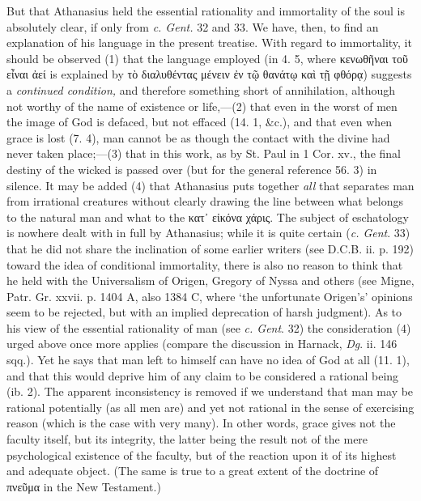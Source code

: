 But that Athanasius held the essential rationality and immortality of the soul is absolutely clear, if only from \emph{c. Gent.} 32 and 33. We have, then, to find an explanation of his language in the present treatise. With regard to immortality, it should be observed (1) that the language employed (in 4. 5, where \textgreek{κενωθῆναι τοῦ εἶναι ἀεί} is explained by \textgreek{τὸ διαλυθέντας μένειν ἐν τῷ θανάτῳ καὶ τῇ φθόρᾳ}) suggests a \emph{continued condition,} and therefore something short of annihilation, although not worthy of the name of existence or life,—(2) that even in the worst of men the image of God is defaced, but not effaced (14. 1, \&c.), and that even when grace is lost (7. 4), man cannot be as though the contact with the divine had never taken place;—(3) that in this work, as by St. Paul in 1 Cor. xv., the final destiny of the wicked is passed over (but for the general reference 56. 3) in silence. It may be added (4) that Athanasius puts together \emph{all} that separates man from irrational creatures without clearly drawing the line between what belongs to the natural man and what to the \textgreek{κατ᾽ εἰκόνα χάρις}. The subject of eschatology is nowhere dealt with in full by Athanasius; while it is quite certain (\emph{c. Gent}. 33) that he did not share the inclination of some earlier writers (see D.C.B. ii. p. 192) toward the idea of conditional immortality, there is also no reason to think that he held with the Universalism of Origen, Gregory of Nyssa and others (see Migne, Patr. Gr. xxvii. p. 1404 A, also 1384 C, where ‘the unfortunate Origen’s’ opinions seem to be rejected, but with an implied deprecation of harsh judgment). As to his view of the essential rationality of man (see \emph{c. Gent}. 32) the consideration (4) urged above once more applies (compare the discussion in Harnack, \emph{Dg}. ii. 146 sqq.). Yet he says that man left to himself can have no idea of God at all (11. 1), and that this would deprive him of any claim to be considered a rational being (ib. 2). The apparent inconsistency is removed if we understand that man may be rational potentially (as all men are) and yet not rational in the sense of exercising reason (which is the case with very many). In other words, grace gives not the faculty itself, but its integrity, the latter being the result not of the mere psychological existence of the faculty, but of the reaction upon it of its highest and adequate object. (The same is true to a great extent of the doctrine of \textgreek{πνεῦμα} in the New Testament.)

